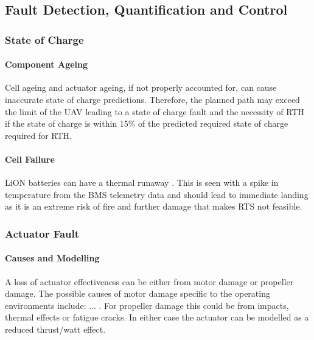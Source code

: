 \subsection{Fault Detection, Quantification and Control}

\subsubsection{State of Charge}
\paragraph{Component Ageing}
Cell ageing and actuator ageing, if not properly accounted for, can cause inaccurate state of charge predictions. Therefore, the planned path may exceed the limit of the \gls{UAV} leading to a state of charge fault and the necessity of \gls{RTH} if the state of charge is within 15\% of the predicted required state of charge required for \gls{RTH}.
\paragraph{Cell Failure}
\gls{LiON} batteries can have a thermal runaway \cite{REF}. This is seen with a spike in temperature from the \gls{BMS} telemetry data and should lead to immediate landing as it is an extreme risk of fire and further damage \cite{REF} that makes \gls{RTS} not feasible.

\subsubsection{Actuator Fault}
\paragraph{Causes and Modelling}
A loss of actuator effectiveness can be either from motor damage or propeller damage. The possible causes of motor damage specific to the operating environments include: ... . For propeller damage this could be from impacts, thermal effects or fatigue cracks. In either case the actuator can be modelled as a reduced thrust/watt effect.
